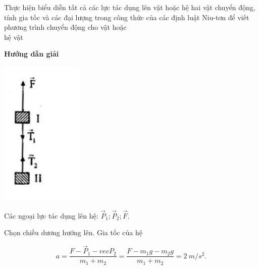 \begin{dang}{Thực hiện biểu diễn tất cả các lực tác dụng lên vật hoặc hệ hai vật chuyển động, tính gia tốc và các đại lượng trong công thức của các định luật Niu-tơn để viết phương trình chuyển động cho vật hoặc \\hệ vật}
	{	\begin{center}
			\textbf{Hướng dẫn giải}
		\end{center}
		\begin{center}
			\includegraphics[scale=0.8]{../figs/VN10-PH-12-A-003-1-V2-02.jpg}
		\end{center}
		Các ngoại lực tác dụng lên hệ: $\vec P_1; \vec P_2; \vec F$.
		
		Chọn chiều dương hướng lên. Gia tốc của hệ
		
		$$a = \dfrac{F - \vec P_1 - vec P_2}{m_1+m_2} = \dfrac{F - m_1g -m_2g}{m_1 + m_2} = \SI{2}{m/s^2}.$$
		
}
\end{dang}
